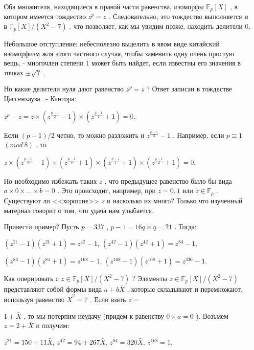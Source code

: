 Оба множителя, находящиеся в правой части равенства, изоморфы $\mathbb{F}_p[X]$
, в котором имеется тождество $z^p=z$
. Следовательно, это тождество выполняется и в $\mathbb{F}_p[X]/(X^2-7)$
, что позволяет, как мы увидим позже, находить делители 0.

Небольшое отступление: небесполезно выделить в явом виде китайский изоморфизм жля этого частного случая, чтобы заменить одну очень простую вещь, - многочлен степени 1 может быть найдет, если известны его значения в точках $\pm\sqrt 7$
.

Но какие делители нуля дают равенство $z^p=z$
? Ответ записан в тождестве Цассенхауза ~- Кантора:

\begin{center}
$z^p-z=z\times(z^{\frac{p-1}{2}}-1)\times(z^{\frac{p-1}{2}}+1)=0$.
\end{center}


Если $(p-1)/2$
 четно, то можно разложить и $z^{\frac{p-1}{2}}-1$
 . Например, если $p\equiv 1$ $(mod \ 8)$
, то

\begin{center}
$z\times(z^{\frac{p-1}{8}}-1)\times(z^{\frac{p-1}{8}}+1)\times(z^{\frac{p-1}{4}}+1)\times(z^{\frac{p-1}{2}}+1)=0$.
\end{center}


Но необходимо избежать таких $z$
, что предыдущее равенство было бы вида $a\times 0\times\dots\times b =0$
. Это происходит, например, при $z=0,1$
 или $z\in\mathbb{F}_p$
 . Существуют ли <<хорошие>> $z$
 и насколько их много? Только что изученный материал говорит о том, что удача нам улыбается.

Привести пример? Пусть $p=337$
, $p-1=16q$ и $q=21$
. Тогда:

\begin{center}
$(z^{21}-1)(z^{21}+1)=z^{42}-1$, $(z^{42}-1)(z^{42}+1)=z^{84}-1$,

$(z^{84}-1)(z^{84}+1)=z^{168}-1$, $(z^{168}-1)(z^{168}+1)=z^{336}-1$.
\end{center}


Как оперировать с $z\in\mathbb{F}_p[X]/(X^2-7)$
? Элементы $z\in\mathbb{F}_p[X]/(X^2-7)$
 представляют собой формы вида $a+b\bar X$
 , которые складывают и перемножают, используя равенство $\bar X^2 = 7$
. Если взять $z=$


\newpage

$1+\bar X$
, то мы потерпим неудачу (придем к равенству $0\times a = 0$
    ). Возьмем $z=2+\bar X$
 и получим:

\begin{center}
$z^{21}=150+11\bar X$, $z^{42}=94+267\bar X$, $z^{84}=320\bar X$, $z^{168}=1$.
\end{center}


